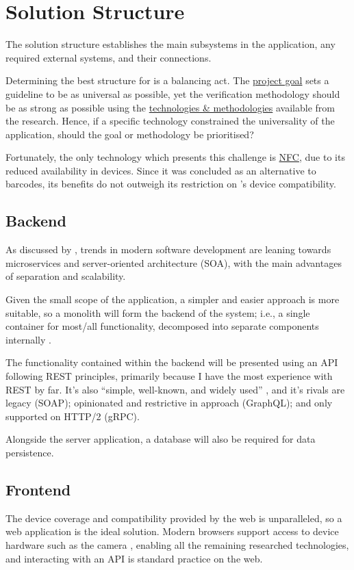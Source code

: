 \section{Solution Structure}

The solution structure establishes the main subsystems in
the application, any required external systems, and their
connections.

Determining the best structure for \projectname{} is a
balancing act.
The \hyperref[ss:goal]{project goal} sets a guideline to be
as universal as possible, yet the verification methodology
should be as strong as possible using the
\hyperref[s:concept]{technologies \& methodologies}
available from the research.
Hence, if a specific technology constrained the
universality of the application, should the goal or
methodology be prioritised?

Fortunately, the only technology which presents this
challenge is \hyperref[ss:nfc]{NFC}, due to its reduced
availability in devices.
Since it was concluded as an alternative to barcodes, its
benefits do not outweigh its restriction on
\projectname{}'s device compatibility.

\subsection{Backend}

As discussed by \cite{soaVsMicroservices}, trends in modern
software development are leaning towards microservices and
server-oriented architecture (SOA), with the main
advantages of separation and scalability.

Given the small scope of the \projectname{} application, a
simpler and easier approach is more suitable, so a monolith
will form the backend of the \projectname{} system; i.e., a
single container for most/all functionality, decomposed
into separate components internally \parencite{monoliths}.

The functionality contained within the backend will be
presented using an API following REST principles, primarily
because I have the most experience with REST by far.
It's also \enquote{simple, well-known, and widely used}
\parencite{protocols}, and it's rivals are legacy (SOAP);
opinionated and restrictive in approach (GraphQL); and only
supported on HTTP/2 (gRPC).

Alongside the server application, a database will also be
required for data persistence.

\subsection{Frontend}

The device coverage and compatibility provided by the web
is unparalleled, so a web application is the ideal
solution.
Modern browsers support access to device hardware such as
the camera \parencite{browserCamera}, enabling all the
remaining researched technologies, and interacting with an
API is standard practice on the web.


